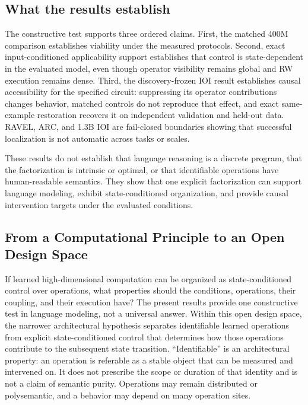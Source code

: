 \documentclass{article}
\begin{document}
\subsection{What the results establish}

The constructive test supports three ordered claims. First, the matched 400M
comparison establishes viability under the measured protocols. Second, exact
input-conditioned applicability support establishes that control is
state-dependent in the evaluated model, even though operator visibility remains
global and RW execution remains dense. Third, the discovery-frozen IOI result
establishes causal accessibility for the specified circuit: suppressing its
operator contributions changes behavior, matched controls do not reproduce that
effect, and exact
same-example restoration recovers it on independent validation and held-out
data. RAVEL, ARC, and 1.3B IOI are fail-closed boundaries showing that successful
localization is not automatic across tasks or scales.

These results do not establish that language reasoning is a discrete program,
that the factorization is intrinsic or optimal, or that identifiable operations
have human-readable semantics. They show that one explicit factorization can
support language modeling, exhibit state-conditioned organization, and provide
causal intervention targets under the evaluated conditions.

\subsection{From a Computational Principle to an Open Design Space}

If learned high-dimensional computation can be organized as state-conditioned
control over operations, what properties should the conditions, operations,
their coupling, and their execution have? The present results provide one
constructive test in language modeling, not a universal answer. Within this open
design space, the narrower architectural hypothesis separates identifiable
learned operations from explicit state-conditioned control that determines how
those operations contribute to
the subsequent state transition. ``Identifiable'' is
an architectural property: an operation is referable as a stable object that
can be measured and intervened on. It does not prescribe the scope or duration
of that identity and is not a claim of semantic purity. Operations may remain
distributed or polysemantic, and a behavior may depend on many operation sites.
\end{document}
